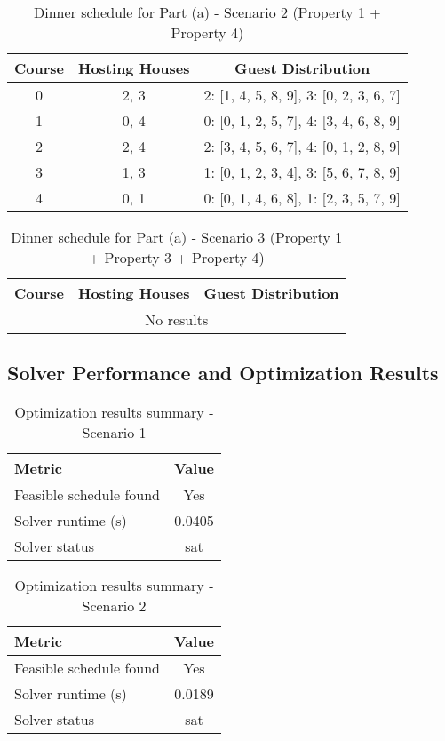\documentclass{article}
\begin{document}
\begin{table}[H]
\centering
\caption{Dinner schedule for Part (a) - Scenario 2 (Property 1 + Property 4)}
\small
\begin{tabular}{c|c|c}
\toprule
Course & Hosting Houses & Guest Distribution \\
\midrule
0 & 2, 3 & 2: [1, 4, 5, 8, 9], 3: [0, 2, 3, 6, 7] \\
1 & 0, 4 & 0: [0, 1, 2, 5, 7], 4: [3, 4, 6, 8, 9] \\
2 & 2, 4 & 2: [3, 4, 5, 6, 7], 4: [0, 1, 2, 8, 9] \\
3 & 1, 3 & 1: [0, 1, 2, 3, 4], 3: [5, 6, 7, 8, 9] \\
4 & 0, 1 & 0: [0, 1, 4, 6, 8], 1: [2, 3, 5, 7, 9] \\
\bottomrule
\end{tabular}
\end{table}

\begin{table}[H]
\centering
\caption{Dinner schedule for Part (a) - Scenario 3 (Property 1 + Property 3 + Property 4)}
\small
\begin{tabular}{c|c|c}
\toprule
Course & Hosting Houses & Guest Distribution \\
\midrule
\multicolumn{3}{c}{No results} \\
\bottomrule
\end{tabular}
\end{table}

\subsection{Solver Performance and Optimization Results}

\begin{table}[H]
\centering
\caption{Optimization results summary - Scenario 1}
\begin{tabular}{l c}
\toprule
Metric & Value \\
\midrule
Feasible schedule found & Yes \\
Solver runtime (s) & 0.0405 \\
Solver status & sat \\
\bottomrule
\end{tabular}
\end{table}

\begin{table}[H]
\centering
\caption{Optimization results summary - Scenario 2}
\begin{tabular}{l c}
\toprule
Metric & Value \\
\midrule
Feasible schedule found & Yes \\
Solver runtime (s) & 0.0189 \\
Solver status & sat \\
\bottomrule
\end{tabular}
\end{table}
\end{document}
